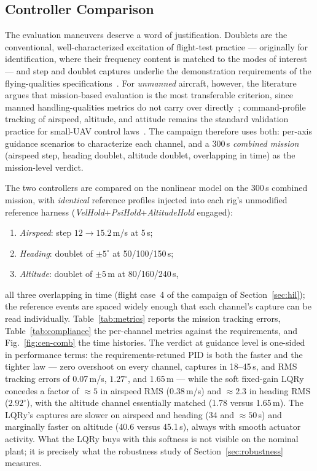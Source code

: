 \subsection{Controller Comparison}
\label{sec:sil-comparison}
The evaluation maneuvers deserve a word of justification. Doublets are
the conventional, well-characterized excitation of flight-test
practice --- originally for identification, where their frequency
content is matched to the modes of
interest~\cite{morelli1999flight,klein2006aircraft} --- and step and
doublet captures underlie the demonstration requirements of the
flying-qualities specifications~\cite{milf8785c1980}. For
\emph{unmanned} aircraft, however, the literature argues that
mission-based evaluation is the most transferable criterion, since
manned handling-qualities metrics do not carry over
directly~\cite{greene2014toward}; command-profile tracking of
airspeed, altitude, and attitude remains the standard validation
practice for small-UAV control laws~\cite{shen2025model}. The
campaign therefore uses both: per-axis guidance scenarios to
characterize each channel, and a 300\,s \emph{combined mission}
(airspeed step, heading doublet, altitude doublet, overlapping in
time) as the mission-level verdict.

The two controllers are compared on the nonlinear model on the 300\,s
combined mission, with \emph{identical} reference profiles injected
into each rig's unmodified reference harness
(\emph{VelHold}+\emph{PsiHold}+\emph{AltitudeHold} engaged):
\begin{enumerate}
  \item \emph{Airspeed}: step $12\!\to\!15.2$\,m/s at 5\,s;
  \item \emph{Heading}: doublet of $\pm5^\circ$ at 50/100/150\,s;
  \item \emph{Altitude}: doublet of $\pm5$\,m at 80/160/240\,s,
\end{enumerate}
all three overlapping in time (flight case~4 of the campaign of
Section~\ref{sec:hil}); the reference events are spaced widely enough
that each channel's capture can be read individually.
Table~\ref{tab:metrics} reports the mission tracking errors,
Table~\ref{tab:compliance} the per-channel metrics against the
requirements, and Fig.~\ref{fig:cen-comb} the time histories.
The verdict at guidance level is one-sided in performance terms: the
requirements-retuned PID is both the faster and the tighter law ---
zero overshoot on every channel, captures in 18--45\,s, and RMS
tracking errors of 0.07\,m/s, $1.27^\circ$, and 1.65\,m --- while the
soft fixed-gain LQRy concedes a factor of ${\approx}5$ in airspeed
RMS (0.38\,m/s) and ${\approx}2.3$ in heading RMS ($2.92^\circ$),
with the altitude channel essentially matched (1.78 versus 1.65\,m).
The LQRy's captures are slower on airspeed and heading (34 and
${\approx}50$\,s) and marginally faster on altitude (40.6 versus
45.1\,s), always with smooth actuator activity. What the LQRy buys
with this softness is not visible on the nominal plant; it is
precisely what the robustness study of Section~\ref{sec:robustness}
measures.

